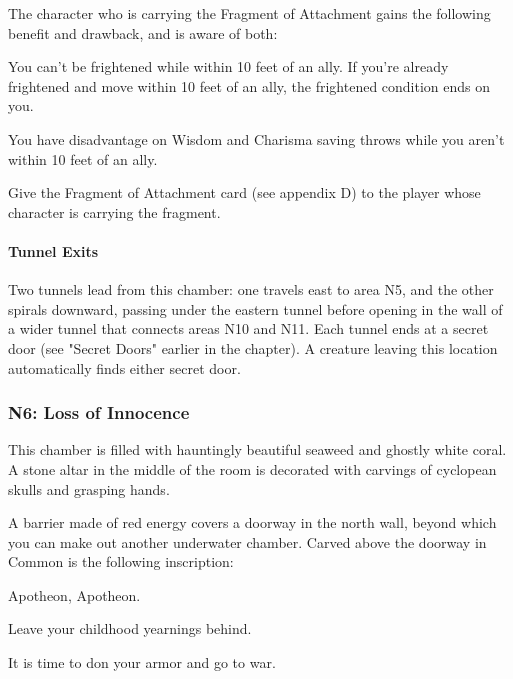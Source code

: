 \documentclass[10pt,a4paper,twoside,twocolumn,openany,nodeprecatedcode]{dndbook}
\begin{document}
The character who is carrying the Fragment of Attachment gains the following benefit and drawback, and is aware of both:

\begin{DndComment}{}

\begin{description}[nolistsep]
\item[Benefit.]
You can't be frightened while within 10 feet of an ally. If you're already frightened and move within 10 feet of an ally, the frightened condition ends on you.
\item[Drawback.]
You have disadvantage on Wisdom and Charisma saving throws while you aren't within 10 feet of an ally.
\end{description}

\end{DndComment}

Give the Fragment of Attachment card (see appendix D) to the player whose character is carrying the fragment.

\paragraph{Tunnel Exits}
Two tunnels lead from this chamber: one travels east to area N5, and the other spirals downward, passing under the eastern tunnel before opening in the wall of a wider tunnel that connects areas N10 and N11. Each tunnel ends at a secret door (see "Secret Doors" earlier in the chapter). A creature leaving this location automatically finds either secret door.

\subsubsection{N6: Loss of Innocence}
\begin{DndReadAloud}{}
This chamber is filled with hauntingly beautiful seaweed and ghostly white coral. A stone altar in the middle of the room is decorated with carvings of cyclopean skulls and grasping hands.

A barrier made of red energy covers a doorway in the north wall, beyond which you can make out another underwater chamber. Carved above the doorway in Common is the following inscription:

Apotheon, Apotheon.

Leave your childhood yearnings behind.

It is time to don your armor and go to war.

\end{DndReadAloud}
\end{document}
